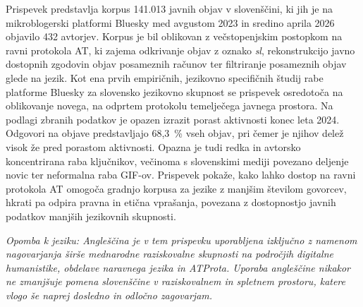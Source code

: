 \documentclass{article}
\begin{document}
\newpage
{}
\begin{abstracteng}
Prispevek predstavlja korpus 141.013 javnih objav v slovenščini, ki jih je na mikroblogerski platformi Bluesky med avgustom 2023 in sredino aprila 2026 objavilo 432 avtorjev. Korpus je bil oblikovan z večstopenjskim postopkom na ravni protokola AT, ki zajema odkrivanje objav z oznako \textit{sl}, rekonstrukcijo javno dostopnih zgodovin objav posameznih računov ter filtriranje posameznih objav glede na jezik. Kot ena prvih empiričnih, jezikovno specifičnih študij rabe platforme Bluesky za slovensko jezikovno skupnost se prispevek osredotoča na oblikovanje novega, na odprtem protokolu temelječega javnega prostora. Na podlagi zbranih podatkov je opazen izrazit porast aktivnosti konec leta 2024. Odgovori na objave predstavljajo 68,3~\% vseh objav, pri čemer je njihov delež visok že pred porastom aktivnosti. Opazna je tudi redka in avtorsko koncentrirana raba ključnikov, večinoma s slovenskimi mediji povezano deljenje novic ter neformalna raba GIF-ov. Prispevek pokaže, kako lahko dostop na ravni protokola AT omogoča gradnjo korpusa za jezike z manjšim številom govorcev, hkrati pa odpira pravna in etična vprašanja, povezana z dostopnostjo javnih podatkov manjših jezikovnih skupnosti.

\textit{Opomba k jeziku: Angleščina je v tem prispevku uporabljena izključno z namenom nagovarjanja širše mednarodne raziskovalne skupnosti na področjih digitalne humanistike, obdelave naravnega jezika in ATProta. Uporaba angleščine nikakor ne zmanjšuje pomena slovenščine v raziskovalnem in spletnem prostoru, katere vlogo še naprej dosledno in odločno zagovarjam.}
\end{abstracteng}
\end{document}
